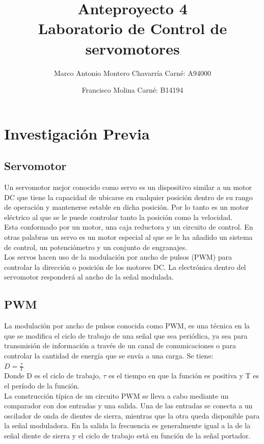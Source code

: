 \documentclass[letterpaper]{article}
\begin{document}
\title{Anteproyecto 4\\ Laboratorio de Control de servomotores}
\author{
 Marco Antonio Montero Chavarría Carné: A94000\\
  \and
  Francisco Molina Carné: B14194\\  
}
\maketitle

\section{Investigación Previa}
\subsection{Servomotor}
 Un servomotor mejor conocido como servo es un dispositivo similar a un motor DC que tiene la capacidad de ubicarse en cualquier posición dentro de su rango de operación y mantenerse estable en dicha posición. Por lo tanto es un motor eléctrico al que se le puede controlar tanto la posición como la velocidad.\\
 Esta conformado por un motor, una caja reductora y un circuito de control. En otras palabras un servo es un motor especial al que se le ha añadido un sistema de control, un potenciómetro y un conjunto de engranajes.\\
 Los servos hacen uso de la modulación por ancho de pulsos (PWM) para controlar la dirección o posición de los motores DC. La electrónica dentro del servomotor responderá al ancho de la señal modulada. 
\subsection{PWM}
 La modulación por ancho de pulsos conocida como PWM, es una técnica en la que se modifica el ciclo de trabajo de una señal que sea periódica, ya sea para transmisión de información a través de un canal de comunicaciones o para controlar la cantidad de energía que se envía a una carga. Se tiene:\\
$D= \frac{ \tau }{T}$\\
Donde D es el ciclo de trabajo, $\tau$ es el tiempo en que la función es positiva y T es el período de la función.\\
La construcción típica de un circuito PWM se lleva a cabo mediante un comparador con dos entradas y una salida. Una de las entradas se conecta a un oscilador de onda de dientes de sierra, mientras que la otra queda disponible para la señal moduladora. En la salida la frecuencia es generalmente igual a la de la señal diente de sierra y el ciclo de trabajo está en función de la señal portador.\\
\end{document}
